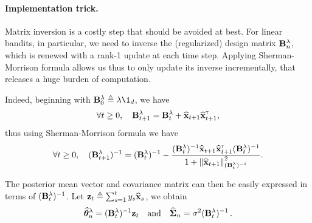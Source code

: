 
%

\paragraph{Implementation trick.}
Matrix inversion is a costly step that should be avoided at best. For linear bandits, in particular, we need to inverse the (regularized) design matrix ${\bf B}^{\lambda}_n$, which is renewed with a rank-1 update at each time step. Applying Sherman-Morrison formula allows us thus to only update its inverse incrementally, that releases a huge burden of computation.

Indeed, beginning with $\bB^{\lambda}_0 \eqdef \lambda\1_d$, we have
\[
    \forall t\geq 0, \quad {\bf B}^{\lambda}_{t+1} = {\bf B}^{\lambda}_t + \widehat{{\bf x}}_{t+1}\widehat{{\bf x}}_{t+1}^\mathsf{\scriptscriptstyle T},
\]
thus using Sherman-Morrison formula we have
\[
    \forall t\geq 0, \quad ({\bf B}^{\lambda}_{t+1})^{-1} = ({\bf B}^{\lambda}_t)^{-1} - \frac{({\bf B}^{\lambda}_t)^{-1}\widehat{{\bf x}}_{t+1}\widehat{{\bf x}}_{t+1}^\mathsf{\scriptscriptstyle T}({\bf B}^{\lambda}_t)^{-1}}{1+\left\lVert\widehat{{\bf x}}_{t+1}\right\rVert_{({\bf B}^{\lambda}_t)^{-1}}^2}.
\]

The posterior mean vector and covariance matrix can then be easily expressed in terms of $({\bf B}^{\lambda}_t)^{-1}$. Let ${\bf z}_t \triangleq \sum_{s=1}^t y_s\widehat{{\bf x}}_s$, we obtain
\[
    \widehat{{\boldsymbol \theta}}_n^{\lambda} = ({\bf B}^{\lambda}_t)^{-1}{\bf z}_t \quad \text{and} \quad \widehat{{\boldsymbol \Sigma}}_n = \sigma^2 ({\bf B}^{\lambda}_t)^{-1}\,.
\]

